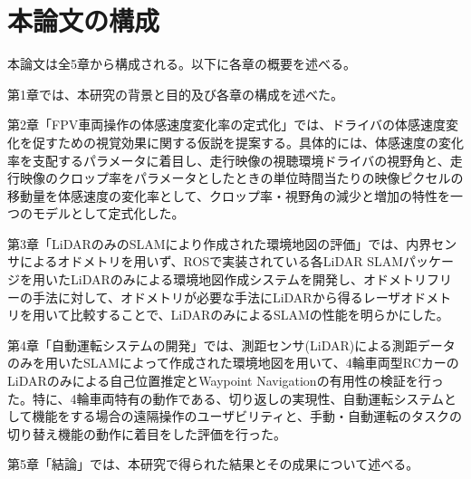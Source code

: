 \section{本論文の構成}

本論文は全5章から構成される。以下に各章の概要を述べる。

第1章では、本研究の背景と目的及び各章の構成を述べた。

第2章「FPV車両操作の体感速度変化率の定式化」では、ドライバの体感速度変化を促すための視覚効果に関する仮説を提案する。具体的には、体感速度の変化率を支配するパラメータに着目し、走行映像の視聴環境ドライバの視野角と、走行映像のクロップ率をパラメータとしたときの単位時間当たりの映像ピクセルの移動量を体感速度の変化率として、クロップ率・視野角の減少と増加の特性を一つのモデルとして定式化した。

第3章「LiDARのみのSLAMにより作成された環境地図の評価」では、内界センサによるオドメトリを用いず、ROSで実装されている各LiDAR SLAMパッケージを用いたLiDARのみによる環境地図作成システムを開発し、オドメトリフリーの手法に対して、オドメトリが必要な手法にLiDARから得るレーザオドメトリを用いて比較することで、LiDARのみによるSLAMの性能を明らかにした。

第4章「自動運転システムの開発」では、測距センサ(LiDAR)による測距データのみを用いたSLAMによって作成された環境地図を用いて、4輪車両型RCカーのLiDARのみによる自己位置推定とWaypoint Navigationの有用性の検証を行った。特に、4輪車両特有の動作である、切り返しの実現性、自動運転システムとして機能をする場合の遠隔操作のユーザビリティと、手動・自動運転のタスクの切り替え機能の動作に着目をした評価を行った。

第5章「結論」では、本研究で得られた結果とその成果について述べる。

